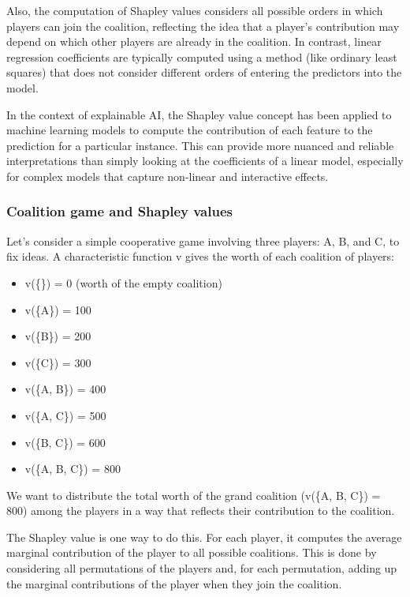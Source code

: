 \documentclass[
  letterpaper,
  DIV=11,
  numbers=noendperiod]{scrartcl}
\providecommand{\tightlist}{%
  \setlength{\itemsep}{0pt}\setlength{\parskip}{0pt}}\usepackage{longtable,booktabs,array}
\begin{document}
Also, the computation of Shapley values considers all possible orders in
which players can join the coalition, reflecting the idea that a
player's contribution may depend on which other players are already in
the coalition. In contrast, linear regression coefficients are typically
computed using a method (like ordinary least squares) that does not
consider different orders of entering the predictors into the model.

In the context of explainable AI, the Shapley value concept has been
applied to machine learning models to compute the contribution of each
feature to the prediction for a particular instance. This can provide
more nuanced and reliable interpretations than simply looking at the
coefficients of a linear model, especially for complex models that
capture non-linear and interactive effects.

\hypertarget{coalition-game-and-shapley-values}{%
\subsubsection{Coalition game and Shapley
values}\label{coalition-game-and-shapley-values}}

Let's consider a simple cooperative game involving three players: A, B,
and C, to fix ideas. A characteristic function v gives the worth of each
coalition of players:

\begin{itemize}
\tightlist
\item
  v(\{\}) = 0 (worth of the empty coalition)
\item
  v(\{A\}) = 100
\item
  v(\{B\}) = 200
\item
  v(\{C\}) = 300
\item
  v(\{A, B\}) = 400
\item
  v(\{A, C\}) = 500
\item
  v(\{B, C\}) = 600
\item
  v(\{A, B, C\}) = 800
\end{itemize}

We want to distribute the total worth of the grand coalition (v(\{A, B,
C\}) = 800) among the players in a way that reflects their contribution
to the coalition.

The Shapley value is one way to do this. For each player, it computes
the average marginal contribution of the player to all possible
coalitions. This is done by considering all permutations of the players
and, for each permutation, adding up the marginal contributions of the
player when they join the coalition.
\end{document}
